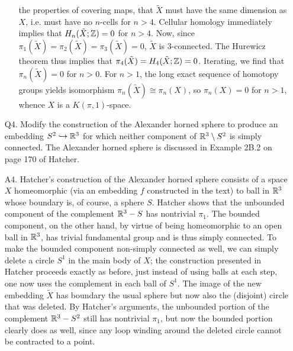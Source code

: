 \documentclass{../mathnotes}
\begin{document}
\begin{enumerate}
\begin{enumerate}[(a)]
                the properties of covering maps, that $\tilde X$ must have the same dimension
                as $X$, i.e. must have no $n$-cells for $n>4$. Cellular homology immediately
                implies that $H_n(\tilde X;\mathbb{Z})=0$ for $n>4$. Now, since
                $\pi_1(\tilde X)=\pi_2(\tilde X)=\pi_3(\tilde X)=0$, $\tilde X$ is 3-connected.
                The Hurewicz theorem thus implies that $\pi_4(\tilde X)=H_4(\tilde X;\mathbb{Z})=0$.
                Iterating, we find that $\pi_n(\tilde X)=0$ for $n>0$. For $n>1$, the
                long exact sequence of homotopy groups yields isomorphism $\pi_n(\tilde X)\cong\pi_n(X)$,
                so $\pi_n(X)=0$ for $n>1$, whence $X$ is a $K(\pi,1)$-space.
        \end{enumerate}
        \newpage
    \item[Q4.] Modify the construction of the Alexander horned sphere to produce an embedding
        $S^2\hookrightarrow\mathbb{R}^3$ for which neither component of $\mathbb{R}^3\setminus S^2$ is simply connected.
        The Alexander horned sphere is discussed in Example 2B.2 on page 170 of Hatcher.
    \item[A4.] Hatcher's construction of the Alexander horned sphere consists of a space $X$
        homeomorphic (via an embedding $f$ constructed in the text) to ball in $\mathbb{R}^3$ whose
        boundary is, of course, a sphere $S$. Hatcher shows that the unbounded component of the
        complement $\mathbb{R}^3-S$ has nontrivial $\pi_1$. The bounded component, on the other hand,
        by virtue of being homeomorphic to an open ball in $\mathbb{R}^3$, has trivial fundamental group
        and is thus simply connected. To make the bounded component non-simply connected
        as well, we can simply delete a circle $S^1$ in the main body of $X$; the construction
        presented in Hatcher proceeds exactly as before, just instead of using balls at each step,
        one now uses the complement in each ball of $S^1$. The image of the new embedding $\tilde X$
        has boundary the usual sphere but now also the (disjoint) circle that was deleted. By Hatcher's
        arguments, the unbounded portion of the complement $\mathbb{R}^3- S^2$ still has nontrivial
        $\pi_1$, but now the bounded portion clearly does as well, since any loop winding around
        the deleted circle cannot be contracted to a point.


\end{enumerate}
\end{document}
